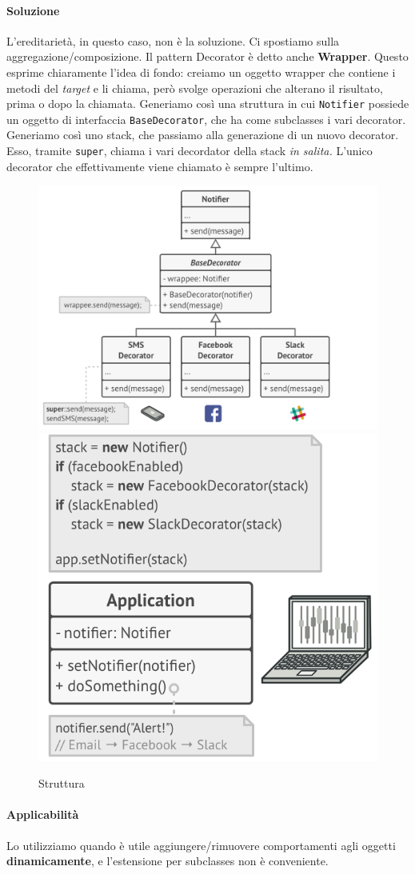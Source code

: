 \documentclass[11pt]{article}
\newcommand{\code}[1]{\texttt{#1}}
\begin{document}
\paragraph{Soluzione}
L'ereditarietà, in questo caso, non è la soluzione. Ci spostiamo sulla aggregazione/composizione. Il pattern Decorator è detto anche \textbf{Wrapper}. Questo esprime chiaramente l'idea di fondo: creiamo un oggetto wrapper che contiene i metodi del \textit{target} e li chiama, però svolge operazioni che alterano il risultato, prima o dopo la chiamata. Generiamo così una struttura in cui \code{Notifier} possiede un oggetto di interfaccia \code{BaseDecorator}, che ha come subclasses i vari decorator. Generiamo così uno stack, che passiamo alla generazione di un nuovo decorator. Esso, tramite \code{super}, chiama i vari decordator della stack \textit{in salita.} L'unico decorator che effettivamente viene chiamato è sempre l'ultimo. 
\begin{figure}[H]
    \includegraphics[width=0.5\linewidth]{res/teoria/Decorator1.png}
    \includegraphics[width=0.5\linewidth]{res/teoria/Decorator2.png}
    \caption{Struttura}
\end{figure}
\paragraph{Applicabilità}
Lo utilizziamo quando è utile aggiungere/rimuovere comportamenti agli oggetti \textbf{dinamicamente}, e l'estensione per subclasses non è conveniente.
\end{document}
